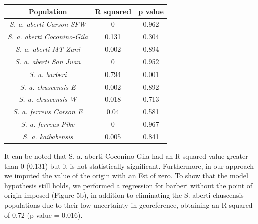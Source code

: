 \documentclass[
]{article}
\begin{document}
\begin{longtable}[]{@{}ccc@{}}
\toprule\noalign{}
Population & R squared & p value \\
\midrule\noalign{}
\endhead
\bottomrule\noalign{}
\endlastfoot
\emph{S. a. aberti Carson-SFW} & 0 & 0.962 \\
\emph{S. a. aberti Coconino-Gila} & 0.131 & 0.304 \\
\emph{S. a. aberti MT-Zuni} & 0.002 & 0.894 \\
\emph{S. a. aberti San Juan} & 0 & 0.952 \\
\emph{S. a. barberi} & 0.794 & 0.001 \\
\emph{S. a. chuscensis E} & 0.002 & 0.892 \\
\emph{S. a. chuscensis W} & 0.018 & 0.713 \\
\emph{S. a. ferreus Carson E} & 0.04 & 0.581 \\
\emph{S. a. ferreus Pike} & 0 & 0.967 \\
\emph{S. a. kaibabensis} & 0.005 & 0.841 \\
\end{longtable}

It can be noted that S. a. aberti Coconino-Gila had an R-squared value
greater than 0 (0.131) but it is not statistically significant.
Furthermore, in our approach we imputed the value of the origin with an
Fst of zero. To show that the model hypothesis still holds, we performed
a regression for barberi without the point of origin imposed (Figure
5b), in addition to eliminating the S. aberti chuscensis populations due
to their low uncertainty in georeference, obtaining an R-squared of 0.72
(p value = 0.016).
\end{document}
